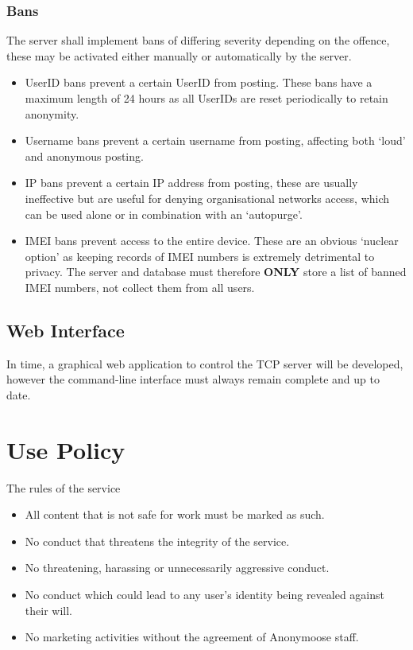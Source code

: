 \documentclass[12pt, a4paper]{article}
\begin{document}
\subsubsection{Bans}
The server shall implement bans of differing severity depending on the offence, these may be activated either manually or automatically by the server.
\begin{itemize}
\item UserID bans prevent a certain UserID from posting. These bans have a maximum length of 24 hours as all UserIDs are reset periodically to retain anonymity.
\item Username bans prevent a certain username from posting, affecting both `loud' and anonymous posting.
\item IP bans prevent a certain IP address from posting, these are usually ineffective but are useful for denying organisational networks access, which can be used alone or in combination with an `autopurge'.
\item IMEI bans prevent access to the entire device. These are an obvious `nuclear option' as keeping records of IMEI numbers is extremely detrimental to privacy. The server and database must therefore \textbf{ONLY} store a list of banned IMEI numbers, not collect them from all users.
\end{itemize}

\subsection{Web Interface}
In time, a graphical web application to control the TCP server will be developed, however the command-line interface must always remain complete and up to date.
\clearpage
\section{Use Policy}
The rules of the service
\begin{itemize}
\item All content that is not safe for work must be marked as such.
\item No conduct that threatens the integrity of the service.
\item No threatening, harassing or unnecessarily aggressive conduct.
\item No conduct which could lead to any user's identity being revealed against their will.
\item No marketing activities without the agreement of Anonymoose staff. 
\end{itemize}
\end{document}
